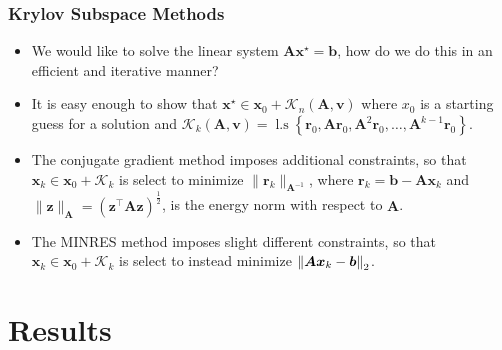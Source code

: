 \documentclass[9pt,hyperref={pdfpagelabels=false},xcolor=table]{beamer}
\begin{document}
\begin{frame}
    \frametitle{Krylov Subspace Methods}
    \begin{itemize}
        \item We would like to solve the linear system $\bm{A} \bm{x^{\star}} = \bm{b}$, how do we do this in an efficient and iterative manner?
              \pause
        \item It is easy enough to show that $\bm{x^{\star}} \in \bm{x}_0 + \mathcal{K}_{n} \left( \bm{A},\bm{v} \right)$ where $x_0$ is a starting guess for a solution and $\mathcal{K}_{k} \left( \bm{A},\bm{v} \right) = \operatorname{l.s} \left\{ \bm{r}_0, \bm{A} \bm{r}_0, \bm{A}^2 \bm{r}_0, \ldots , \bm{A}^{k-1} \bm{r}_0 \right\}$.
              \pause
        \item The conjugate gradient method imposes additional constraints, so that $\bm{x}_k \in \bm{x}_0 + \mathcal{K}_k$ is select to minimize $\| \bm{r}_{k} \|_{\bm{A}^{-1}}$, where $\bm{r}_{k} = \bm{b} - \bm{A} \bm{x}_k$ and $\| \bm{z} \|_{\bm{A}} = \left( \bm{z}^{\intercal} \bm{A} \bm{z} \right)^{\frac{1}{2}}$, is the energy norm with respect to $\bm{A}$.
              \pause
        \item The MINRES method imposes slight different constraints, so that $\bm{x}_k \in \bm{x}_0 + \mathcal{K}_k$ is select to instead minimize $\left\lVert\bm{A} \bm {x}_k - \bm{b}\right\rVert_2$.
    \end{itemize}
\end{frame}

\section{Results}
\end{document}
